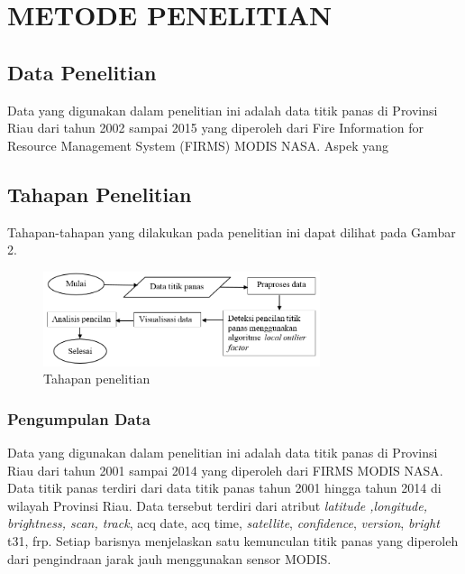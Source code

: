 \section*{METODE PENELITIAN}


\subsection*{Data Penelitian}
Data yang digunakan dalam penelitian ini adalah data titik panas di Provinsi Riau dari tahun 2002 sampai 2015 yang diperoleh dari Fire Information for Resource Management System (FIRMS) MODIS NASA. Aspek yang 

\subsection*{Tahapan Penelitian}
Tahapan-tahapan yang dilakukan pada penelitian ini dapat dilihat pada Gambar 2.

\begin{figure}[h!]\centering %
\includegraphics[width=230pt]{tahapanPenelitian.png}
\caption{Tahapan penelitian}
\label{fig:tahapanPenelitian}
\end{figure}

\subsubsection*{Pengumpulan Data}
Data yang digunakan dalam penelitian ini adalah data titik panas di Provinsi Riau dari tahun 2001 sampai 2014 yang diperoleh dari FIRMS MODIS NASA. Data titik panas terdiri dari data titik panas tahun 2001 hingga tahun 2014 di wilayah Provinsi Riau. Data tersebut terdiri dari atribut \textit{latitude ,longitude, brightness, scan, track}, acq date, acq time, \textit{satellite}, \textit{confidence}, \textit{version}, \textit{bright} t31, frp. Setiap barisnya menjelaskan satu kemunculan titik panas yang diperoleh dari pengindraan jarak jauh menggunakan sensor MODIS.  


